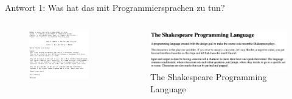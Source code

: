             \begin{frame}{Antwort 1: Was hat das mit Programmiersprachen zu tun?}

                \begin{columns}
                    \begin{column}{0.4\linewidth}
                        \begin{figure}
                            \centering
                            \includegraphics[width=\linewidth,height=0.5\textheight,keepaspectratio]{chapters/04_programming_languages/figures/shakespeare_code.png}
                        \end{figure}
                    \end{column}
                    \begin{column}{0.6\linewidth}
                        \begin{figure}
                            \centering
                            \includegraphics[width=\linewidth,height=0.5\textheight,keepaspectratio]{chapters/04_programming_languages/figures/shakespeare.png}
                            \caption{The Shakespeare Programming Language \cite{shakespeare_pl}}

\end{figure}
\end{column}
\end{columns}
\end{frame}
